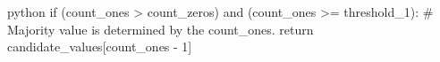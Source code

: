 python
if (count_ones > count_zeros) and (count_ones >= threshold_1):
    # Majority value is determined by the count_ones.
    return candidate_values[count_ones - 1]